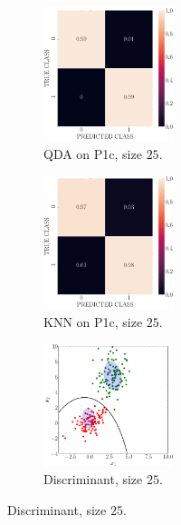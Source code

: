 \documentclass[11pt, a4 paper]{article}
\begin{document}
\begin{figure}[!htbp]
\quad    
    \begin{subfigure}[!htbp]{0.24\textwidth}
       \centering
       \includegraphics[width=1.5in]{../results/ex1/conf_mtx_QD_ML_dataset_P1c_size_25.pdf}
       \caption{QDA on P1c, size $25$.}
       \label{fig:KNN_P1c_25}
    \end{subfigure}
\quad    
    \begin{subfigure}[!htbp]{0.24\textwidth}
       \centering
       \includegraphics[width=1.5in]{../results/ex1/conf_mtx_KNN_dataset_P1c_size_25.pdf}
       \caption{KNN on P1c, size $25$.}
       \label{fig:KNN_P1c_25}
    \end{subfigure}
\quad
    \begin{subfigure}[!htbp]{0.24\textwidth}
       \centering
       \includegraphics[width=1.5in]{../results/ex1/samples_QD_ML_dataset_P1c_size_25.pdf}
       \caption{Discriminant, size $25$.}
       \label{fig:KNN_P1c_25}
    \end{subfigure}
    

\end{figure}
\end{document}
